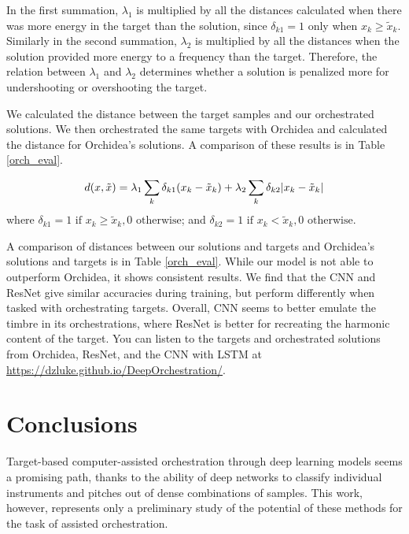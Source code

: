 \documentclass[runningheads,a4paper]{llncs}
\begin{document}
In the first summation, $\lambda_1$ is multiplied by all the distances calculated when there was more energy in the target than the solution, since $\delta_{k1} = 1$ only when $x_k \ge \tilde{x}_k$. Similarly in the second summation, $\lambda_2$ is multiplied by all the distances when the solution provided more energy to a frequency than the target. Therefore, the relation between $\lambda_1$ and $\lambda_2$ determines whether a solution is penalized more for undershooting or overshooting the target.

We calculated the distance between the target samples and our orchestrated solutions. We then orchestrated the same targets with Orchidea and calculated the distance for Orchidea's solutions. A comparison of these results is in Table \ref{orch_eval}.

\begin{equation}\label{distance}
d(x, \tilde{x}) =\lambda_1 \sum_k \delta_{k1}(x_k - \tilde{x}_k) + \lambda_2 \sum_k \delta_{k2}|x_k - \tilde{x	}_k| \\
\end{equation}
where $\delta_{k1} = 1 \text{  if  } x_k \ge \tilde{x}_k, 0 \text{  otherwise}$; and $\delta_{k2} = 1 \text{  if  } x_k < \tilde{x}_k, 0 \text{  otherwise}$.

A comparison of distances between our solutions and targets and Orchidea's solutions and targets is in Table \ref{orch_eval}. While our model is not able to outperform Orchidea, it shows consistent results. We find that the CNN and ResNet give similar accuracies during training, but perform differently when tasked with orchestrating targets. Overall, CNN seems to better emulate the timbre in its orchestrations, where ResNet is better for recreating the harmonic content of the target. You can listen to the targets and orchestrated solutions from Orchidea, ResNet, and the CNN with LSTM at \url{https://dzluke.github.io/DeepOrchestration/}.


\section{Conclusions}
\label{sec:conclusions}

Target-based computer-assisted orchestration through deep learning models seems a promising path, thanks to the ability of deep networks to classify individual instruments and pitches out of dense combinations of samples. This work, however, represents only a preliminary study of the potential of these methods for the task of assisted orchestration. 
\end{document}
